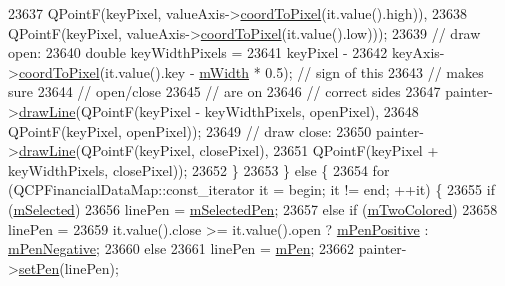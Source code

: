\begin{DoxyCode}
23637           QPointF(keyPixel, valueAxis->\hyperlink{class_q_c_p_axis_a985ae693b842fb0422b4390fe36d299a}{coordToPixel}(it.value().high)),
23638           QPointF(keyPixel, valueAxis->\hyperlink{class_q_c_p_axis_a985ae693b842fb0422b4390fe36d299a}{coordToPixel}(it.value().low)));
23639       \textcolor{comment}{// draw open:}
23640       \textcolor{keywordtype}{double} keyWidthPixels =
23641           keyPixel -
23642           keyAxis->\hyperlink{class_q_c_p_axis_a985ae693b842fb0422b4390fe36d299a}{coordToPixel}(it.value().key - \hyperlink{class_q_c_p_financial_af630e5eb8485146b9c777e63fd1cf993}{mWidth} * 0.5); \textcolor{comment}{// sign of this}
23643                                                                 \textcolor{comment}{// makes sure}
23644                                                                 \textcolor{comment}{// open/close}
23645                                                                 \textcolor{comment}{// are on}
23646                                                                 \textcolor{comment}{// correct sides}
23647       painter->\hyperlink{class_q_c_p_painter_a0b4b1b9bd495e182c731774dc800e6e0}{drawLine}(QPointF(keyPixel - keyWidthPixels, openPixel),
23648                         QPointF(keyPixel, openPixel));
23649       \textcolor{comment}{// draw close:}
23650       painter->\hyperlink{class_q_c_p_painter_a0b4b1b9bd495e182c731774dc800e6e0}{drawLine}(QPointF(keyPixel, closePixel),
23651                         QPointF(keyPixel + keyWidthPixels, closePixel));
23652     \}
23653   \} \textcolor{keywordflow}{else} \{
23654     \textcolor{keywordflow}{for} (QCPFinancialDataMap::const\_iterator it = begin; it != end; ++it) \{
23655       \textcolor{keywordflow}{if} (\hyperlink{class_q_c_p_abstract_plottable_a43f68a0603e9bcd016bdfa6d9d5c41c9}{mSelected})
23656         linePen = \hyperlink{class_q_c_p_abstract_plottable_a10619472f5d5e10e9519a599f1cf5576}{mSelectedPen};
23657       \textcolor{keywordflow}{else} \textcolor{keywordflow}{if} (\hyperlink{class_q_c_p_financial_a6afe919190b884d9bac026cefcc8c0a8}{mTwoColored})
23658         linePen =
23659             it.value().close >= it.value().open ? \hyperlink{class_q_c_p_financial_aa6599186f417ba615caebb3f6c762bd8}{mPenPositive} : 
      \hyperlink{class_q_c_p_financial_a263fbfefde2cc19c8d4024a8319c2bbb}{mPenNegative};
23660       \textcolor{keywordflow}{else}
23661         linePen = \hyperlink{class_q_c_p_abstract_plottable_a67bc0622fd1b9fa14e54c14922dcec66}{mPen};
23662       painter->\hyperlink{class_q_c_p_painter_af9c7a4cd1791403901f8c5b82a150195}{setPen}(linePen);

\end{DoxyCode}
